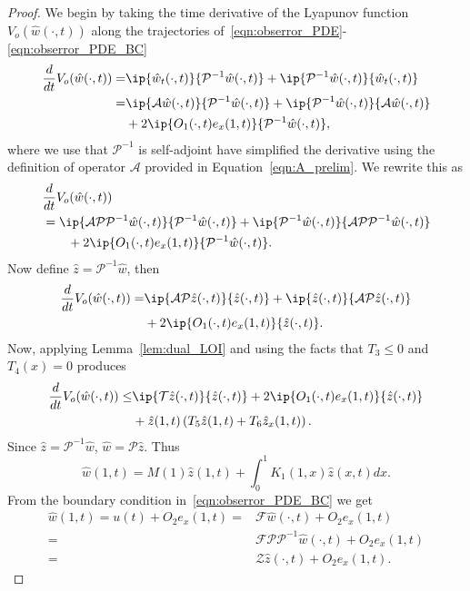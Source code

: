 \documentclass[US letter, 9 pt, conference]{ieeeconf}  \usepackage{setspace}
\newcommand{\igzo}{\int_0^1}
\newcommand{\wh}{\hat{w}}
\newcommand{\mcl}[1]{\mathcal{#1}}
\newcommand{\pop}{\mathcal{P}}
\newcommand{\pinv}{\mathcal{P}^{-1}}
\newcommand{\zh}{\hat{z}}
\begin{document}
\begin{proof}
We begin by taking the time derivative of the Lyapunov function $V_o(\wh(\cdot,t))$ along the trajectories of~\eqref{eqn:obserror_PDE}-\eqref{eqn:obserror_PDE_BC}
\begin{align*}
\frac{d}{dt}V_o(\wh(\cdot,t))=&\ip{\wh_t(\cdot,t)}{\pinv \wh(\cdot,t)}+\ip{\pinv \wh(\cdot,t)}{ \wh_t(\cdot,t)}\\
=&\ip{\mcl{A}\wh(\cdot,t)}{\pinv \wh(\cdot,t)}+\ip{\pinv \wh(\cdot,t)}{ \mcl{A}\wh(\cdot,t)}\\
&+2 \ip{O_1(\cdot,t)e_x(1,t)}{\pinv \wh(\cdot,t)},
\end{align*} where we use that $\pinv$ is self-adjoint have simplified the derivative using the definition of operator $\mcl{A}$ provided in Equation~\eqref{eqn:A_prelim}. We rewrite this as
\begin{align*}
&\frac{d}{dt}V_o(\wh(\cdot,t))\\
&=\ip{\mcl{A}\pop \pinv \wh(\cdot,t)}{\pinv \wh(\cdot,t)}+\ip{\pinv \wh(\cdot,t)}{ \mcl{A} \pop \pinv \wh(\cdot,t)}\\
&\quad \quad +2 \ip{O_1(\cdot,t)e_x(1,t)}{\pinv \wh(\cdot,t)}.
\end{align*} Now define $\zh=\pinv \wh$, then
\begin{align*}
\frac{d}{dt}V_o(\wh(\cdot,t))=&\ip{\mcl{A}\pop \zh(\cdot,t)}{\zh(\cdot,t)}+\ip{\zh(\cdot,t)}{ \mcl{A} \pop \zh(\cdot,t)}\\
& +2 \ip{O_1(\cdot,t)e_x(1,t)}{\zh(\cdot,t)}.
\end{align*} Now, applying Lemma~\ref{lem:dual_LOI} and using the facts that $T_3 \leq 0$ and $T_4(x)=0$ produces
\begin{align}
\frac{d}{dt}V_o(\wh(\cdot,t)) \leq & \ip{\mcl{T}\zh(\cdot,t)}{\zh(\cdot,t)}+2 \ip{O_1(\cdot,t)e_x(1,t)}{\zh(\cdot,t)} \nonumber \\
&\label{eqn:cont:Vdot1} +\zh(1,t) \left(T_5 \zh(1,t)+T_6 \zh_x(1,t) \right).
\end{align} Since $\zh=\pinv \wh$, $\wh=\pop \zh$. Thus
\begin{equation}\label{eqn:cont:1}
\wh(1,t)=M(1)\zh(1,t)+\igzo K_1(1,x)\zh(x,t)dx.
\end{equation} From the boundary condition in~\eqref{eqn:obserror_PDE_BC} we get
\begin{align*}
\wh(1,t)=u(t)+O_2 e_x(1,t)=& \mcl{F}\wh(\cdot,t)+O_2 e_x(1,t)\\
=& \mcl{F}\pop \pinv \wh(\cdot,t)+O_2 e_x(1,t)\\
=& \mcl{Z}\zh(\cdot,t)+O_2 e_x(1,t).

\end{align*}
\end{proof}
\end{document}
